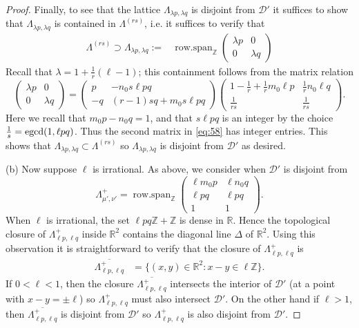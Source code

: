 \documentclass[11pt, letterpaper, reqno]{amsart}
\theoremstyle{definition}
\theoremstyle{remark}
\numberwithin{equation}{section}
\newcommand{\RR}{\ensuremath{\mathbb{R}}}
\newcommand{\ZZ}{\ensuremath{\mathbb{Z}}}
\newcommand{\uu}{{\mu'}}
\newcommand{\vv}{{\nu'}}
\newcommand{\cDprime}{{\mathcal{D}'}}
\newcommand{\egcd}{{\rm egcd}}
\DeclareMathOperator{\rowspan}{row.span}
\begin{document}
\begin{proof}
Finally, to see that the lattice $\Lambda_{\lambda p, \lambda q}$ is disjoint from $\cDprime$
it suffices to show that 
$\Lambda_{\lambda p, \lambda q}$
is contained in 
$\Lambda^{(rs)}$,
i.e.  it suffices to verify  that
\begin{align*} 
\Lambda^{(rs)} \supset \Lambda_{\lambda p, \lambda q} :=& \rowspan_\ZZ\begin{pmatrix}
\lambda p & 0  \\
0 &  \lambda q 
\end{pmatrix} 
\end{align*}
Recall that $\lambda = 1 + \frac1{r}(\ell-1)$;
this containment follows from the matrix relation
\begin{equation}
\label{eq:58}
 \begin{pmatrix}
\lambda  p & 0 \\
0 &  \lambda q
\end{pmatrix}
=  \begin{pmatrix}
p & - n_0 s \ell pq \\
-q & (r-1)sq + m_0 s \ell pq   
\end{pmatrix} 
\begin{pmatrix}
1- \frac{1}{r}+ \frac{1}{r}m_0 \ell p & \frac{1}{r}n_0 \ell q \\
 \frac{1}{rs} & \frac{1}{rs} \end{pmatrix} . 
\end{equation}
Here we recall that $m_0 p - n_0 q = 1$, and that $s \ell pq$ is an integer 
by the choice $\frac1s = \egcd(1, \ell pq)$.
Thus the second matrix in  \eqref{eq:58} has integer entries.
This shows that $\Lambda_{\lambda p, \lambda q} \subset \Lambda^{(rs)}$
so $\Lambda_{\lambda p, \lambda q}$ is disjoint from $\cDprime$ as desired.


(b)
Now suppose $\ell$ is irrational.
As above, we consider when $\cDprime$ is disjoint from
\[ 
\Lambda^+_{\uu,\vv} = 
\rowspan_\ZZ \begin{pmatrix}
\ell m_0p & \ell n_0q \\
\ell pq & \ell pq \\
1 & 1 \end{pmatrix} .\]
When $\ell$ is irrational, the set $\ell pq \ZZ + \ZZ$ is dense in $\RR$.
Hence the topological closure of $\Lambda^+_{\ell p, \ell q}$ inside $\RR^2$ 
contains the diagonal line $\Delta$ of $\RR^2$.
Using this observation it is straightforward to verify that 
the closure of $\Lambda^+_{\ell p, \ell q}$ is
\begin{align*} 
\overline{\Lambda^+_{\ell p, \ell q}} 
  &= \{(x,y) \in \RR^2 : x - y \in \ell \ZZ\} .
\end{align*}
If $0< \ell < 1$, then the closure $\overline{\Lambda^+_{\ell p, \ell q}}$ intersects the interior of $\cDprime$
(at a point with  $x-y = \pm \ell$)
so ${\Lambda^+_{\ell p, \ell q}}$ must also intersect $\cDprime$.
On the other hand if $\ell > 1$, then $\overline{\Lambda^+_{\ell p, \ell q}}$ is disjoint from $\cDprime$ so 
 ${\Lambda^+_{\ell p, \ell q}}$ is also disjoint from  $\cDprime$.
\end{proof}
\end{document}
